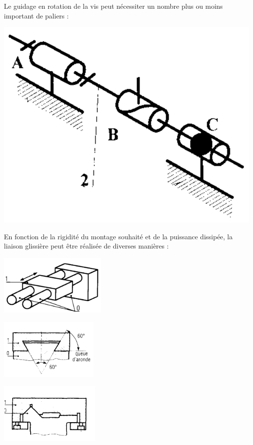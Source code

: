\documentclass[11pt,oneside]{article}
\begin{document}
Le guidage en rotation de la vis peut nécessiter un nombre plus ou moins important de paliers :
\begin{center}
\includegraphics[width=.4\textwidth]{png/fig_104}
\end{center}

En fonction de la rigidité du montage souhaité et de la puissance dissipée, la liaison glissière peut être réalisée de diverses manières :

\begin{minipage}[c]{.3\linewidth}
\begin{center}
\includegraphics[height=3cm]{png/fig_105}
\end{center}
\end{minipage} \hfill
\begin{minipage}[c]{.3\linewidth}
\begin{center}
\includegraphics[height=3cm]{png/fig_106}
\end{center}
\end{minipage}\hfill
\begin{minipage}[c]{.3\linewidth}
\begin{center}
\includegraphics[height=3cm]{png/fig_107}
\end{center}
\end{minipage}
\end{document}
